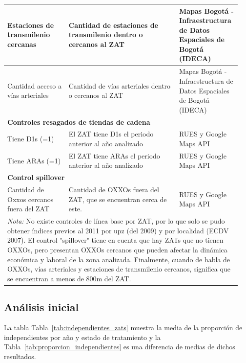 \documentclass{article}
\begin{document}
\begin{longtable}{p{0.25\linewidth} p{0.45\linewidth} p{0.25\linewidth}}
\midrule
Estaciones de transmilenio cercanas & Cantidad de estaciones de transmilenio dentro o cercanos al ZAT & Mapas Bogotá - Infraestructura de Datos Espaciales de Bogotá (IDECA) \\
\midrule
Cantidad acceso a vías arteriales & Cantidad de vías arteriales dentro o cercanos al ZAT & Mapas Bogotá - Infraestructura de Datos Espaciales de Bogotá (IDECA) \\
\midrule
\multicolumn{3}{l}{\textbf{Controles resagados de tiendas de cadena}} \\
\midrule
Tiene D1s (=1) & El ZAT tiene D1s el periodo anterior al año analizado & RUES y Google Maps API \\
\midrule
Tiene ARAs (=1) & El ZAT tiene ARAs el periodo anterior al año analizado & RUES y Google Maps API \\
\midrule
\multicolumn{3}{l}{\textbf{Control spillover}} \\
\midrule
Cantidad de Oxxos cercanos fuera del ZAT & Cantidad de OXXOs fuera del ZAT, que se encuentran cerca de este. & RUES y Google Maps API \\
\bottomrule
\multicolumn{3}{p{\linewidth}}{%
\vspace{0.5em}
\textit{Nota:} No existe controles de línea base por ZAT, por lo que solo se pudo obtener índices previos al 2011 por upz (del 2009) y por localidad (ECDV 2007). El control "spillover" tiene en cuenta que hay ZATs que no tienen OXXOs, pero presentan OXXOs cercanos que pueden afectar la dinámica económica y laboral de la zona analizada. Finalmente, cuando de habla de OXXOs, vías arteriales y estaciones de transmilenio cercanos, significa que se encuentran a menos de 800m del ZAT.}
\end{longtable}



\subsection{Análisis inicial}

La tabla Tabla~\ref{tab:independientes_zats} muestra la media de la proporción de independientes por año y estado de tratamiento y la Tabla~\ref{tab:proporcion_independientes} es una diferencia de medias de dichos resultados.  
\end{document}
